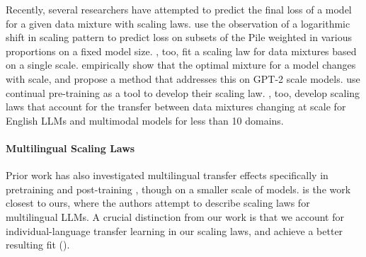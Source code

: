 Recently, several researchers have attempted to predict the final loss of a model for a given data mixture with scaling laws. \cite{ge2024data} use the observation of a logarithmic shift in scaling pattern to predict loss on subsets of the Pile weighted in various proportions on a fixed model size. \cite{ye2024data}, too, fit a scaling law for data mixtures based on a single scale. \cite{kang2024autoscale} empirically show that the optimal mixture for a model changes with scale, and propose a method that addresses this on GPT-2 scale models. \cite{que2024d} use continual pre-training as a tool to develop their scaling law. \cite{shukor2025scaling}, too, develop scaling laws that account for the transfer between data mixtures changing at scale for English LLMs and multimodal models for less than 10 domains. 

\paragraph{Multilingual Scaling Laws}
Prior work has also investigated multilingual transfer effects specifically in pretraining \citep{chang2024multilinguality} and post-training \citep{shimabucoro2025post}, though on a smaller scale of models.
\citet{he2024scaling} is the work closest to ours, where the authors attempt to describe scaling laws for multilingual LLMs. A crucial distinction from our work is that we account for individual-language transfer learning in our scaling laws, and achieve a better resulting fit ().


